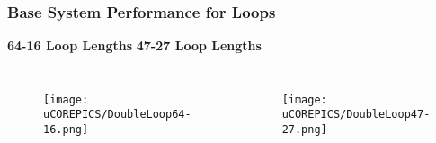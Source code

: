 \documentclass{beamer}
\begin{document}
\begin{frame}
\frametitle{Base System Performance for Loops}




\hspace{1cm} \textbf{64-16 Loop Lengths}
\hspace{2.5cm} \textbf{47-27 Loop Lengths}

\begin{columns}[c]

\begin{figure}

\texttt{[image: uCOREPICS/DoubleLoop64-16.png]}
\end{figure}

\begin{figure}
\texttt{[image: uCOREPICS/DoubleLoop47-27.png]}
\end{figure}

\end{columns}

\begin{itemize}

\end{itemize}

\end{frame}

\end{document}

